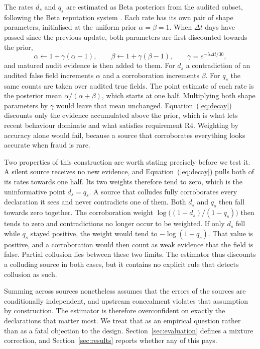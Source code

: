 \documentclass[information,article,submit,moreauthors]{Definitions/mdpi}
\begin{document}
The rates $d_s$ and $q_s$ are estimated as Beta posteriors from the audited subset, following the Beta reputation system \cite{josang2002beta}. Each rate has its own pair of shape parameters, initialised at the uniform prior $\alpha = \beta = 1$. When $\Delta t$ days have passed since the previous update, both parameters are first discounted towards the prior,
\begin{equation}\label{eq:decay}
\alpha \leftarrow 1 + \gamma(\alpha - 1), \qquad \beta \leftarrow 1 + \gamma(\beta - 1), \qquad \gamma = e^{-\lambda \Delta t / 30},
\end{equation}
and matured audit evidence is then added to them. For $d_s$ a contradiction of an audited false field increments $\alpha$ and a corroboration increments $\beta$. For $q_s$ the same counts are taken over audited true fields. The point estimate of each rate is the posterior mean $\alpha/(\alpha+\beta)$, which starts at one half. Multiplying both shape parameters by $\gamma$ would leave that mean unchanged. Equation~(\ref{eq:decay}) discounts only the evidence accumulated above the prior, which is what lets recent behaviour dominate and what satisfies requirement R4. Weighting by accuracy alone would fail, because a source that corroborates everything looks accurate when fraud is rare.

Two properties of this construction are worth stating precisely before we test it. A silent source receives no new evidence, and Equation~(\ref{eq:decay}) pulls both of its rates towards one half. Its two weights therefore tend to zero, which is the uninformative point $d_s = q_s$. A source that colludes fully corroborates every declaration it sees and never contradicts one of them. Both $d_s$ and $q_s$ then fall towards zero together. The corroboration weight $\log\big((1-d_s)/(1-q_s)\big)$ then tends to zero and contradictions no longer occur to be weighted. If only $d_s$ fell while $q_s$ stayed positive, the weight would tend to $-\log(1-q_s)$. That value is positive, and a corroboration would then count as weak evidence that the field is false. Partial collusion lies between these two limits. The estimator thus discounts a colluding source in both cases, but it contains no explicit rule that detects collusion as such.

Summing across sources nonetheless assumes that the errors of the sources are conditionally independent, and upstream concealment violates that assumption by construction. The estimator is therefore overconfident on exactly the declarations that matter most. We treat that as an empirical question rather than as a fatal objection to the design. Section~\ref{sec:evaluation} defines a mixture correction, and Section~\ref{sec:results} reports whether any of this pays.
\end{document}
